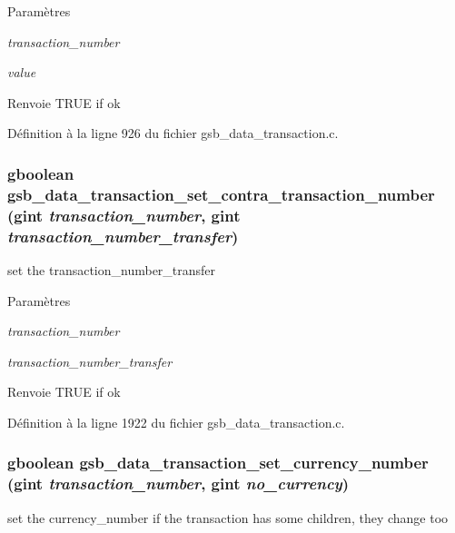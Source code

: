 \begin{DoxyParams}{Paramètres}
\item[{\em transaction\_\-number}]\item[{\em value}]\end{DoxyParams}
\begin{DoxyReturn}{Renvoie}
TRUE if ok 
\end{DoxyReturn}


Définition à la ligne 926 du fichier gsb\_\-data\_\-transaction.c.

\subsubsection[{gsb\_\-data\_\-transaction\_\-set\_\-contra\_\-transaction\_\-number}]{\setlength{\rightskip}{0pt plus 5cm}gboolean gsb\_\-data\_\-transaction\_\-set\_\-contra\_\-transaction\_\-number (gint {\em transaction\_\-number}, \/  gint {\em transaction\_\-number\_\-transfer})}\label{gsb__data__transaction_8h_a7b333676b59c4dae3c5e56a88b4981e3}
set the transaction\_\-number\_\-transfer


\begin{DoxyParams}{Paramètres}
\item[{\em transaction\_\-number}]\item[{\em transaction\_\-number\_\-transfer}]\end{DoxyParams}
\begin{DoxyReturn}{Renvoie}
TRUE if ok 
\end{DoxyReturn}


Définition à la ligne 1922 du fichier gsb\_\-data\_\-transaction.c.

\subsubsection[{gsb\_\-data\_\-transaction\_\-set\_\-currency\_\-number}]{\setlength{\rightskip}{0pt plus 5cm}gboolean gsb\_\-data\_\-transaction\_\-set\_\-currency\_\-number (gint {\em transaction\_\-number}, \/  gint {\em no\_\-currency})}\label{gsb__data__transaction_8h_ad36cc91a9e388b0d249e8d65c17debc0}
set the currency\_\-number if the transaction has some children, they change too


